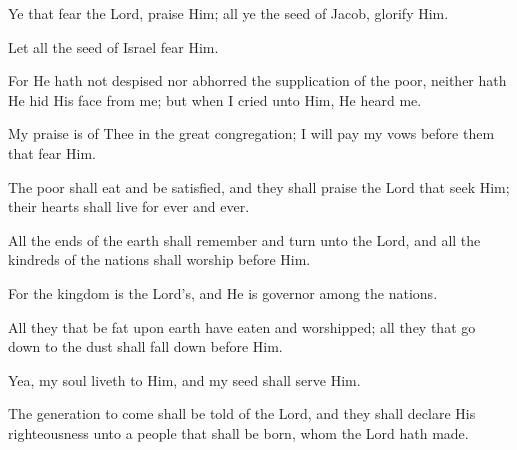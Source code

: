 Ye that fear the Lord, praise Him; all ye the seed of Jacob, glorify Him.

Let all the seed of Israel fear Him.

For He hath not despised nor abhorred the supplication of the poor, neither hath He hid His face from me; but when I cried unto Him, He heard me.

My praise is of Thee in the great congregation; I will pay my vows before them that fear Him.

The poor shall eat and be satisfied, and they shall praise the Lord that seek Him; their hearts shall live for ever and ever.

All the ends of the earth shall remember and turn unto the Lord, and all the kindreds of the nations shall worship before Him.

For the kingdom is the Lord's, and He is governor among the nations.

All they that be fat upon earth have eaten and worshipped; all they that go down to the dust shall fall down before Him.

Yea, my soul liveth to Him, and my seed shall serve Him.

The generation to come shall be told of the Lord, and they shall declare His righteousness unto a people that shall be born, whom the Lord hath made.
